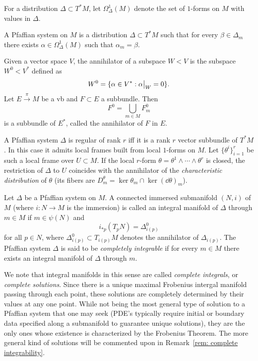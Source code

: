 For a distribution $\Delta\subset T^\ast M$, let $\Omega^1_\Delta(M)$ denote the set of $1$-forms on $M$ with values in $\Delta$.

\begin{defn}
    A Pfaffian system on $M$ is a distribution $\Delta\subset T^\ast M$ such that for every $\beta\in\Delta_m$ there exists $\alpha\in\Omega^1_\Delta(M)$ such that $\alpha_m=\beta$.
\end{defn}

\begin{defn}[Annihilator]
    Given a vector space $V$, the annihilator of a subspace $W<V$ is the subspace $W^0<V^\ast$ defined as
    \[W^0=\{\alpha\in V^\ast: \restr{\alpha}{W}=0 \}.\]
    Let $E\overset{\pi}{\to}M$ be a \gls{vb} and $F\subset E$ a subbundle. Then
    \[F^0=\bigcup_{m\in M}F_m^0\]
    is a subbundle of $E^\ast$, called the annihilator of $F$ in $E$.
\end{defn}


\begin{rem}
    A Pfaffian system $\Delta$ is regular of rank $r$ iff it is a rank $r$ vector subbundle of $T^\ast M$. In this case it admits local frames built from local $1$-forms on $M$. Let $\{\theta^i\}_{i=1}^r$ be such a local frame over $U\subset M$. If the local $r$-form $\theta=\theta^1\wedge\cdots\wedge\theta^r$ is closed, the restriction of $\Delta$ to $U$ coincides with the annihilator of the \emph{characteristic distribution} of $\theta$ (its fibers are $D^\theta_m=\ker\theta_m\cap \ker(\dd\theta)_m$).
\end{rem}

\begin{defn}
    Let $\Delta$ be a Pfaffian system on $M$. A connected immersed submanifold $(N,i)$ of $M$ (where $i:N\to M$ is the immersion) is called an integral manifold of $\Delta$ through $m\in M$ if $m\in\psi(N)$ and 
    \[i_{\ast p}(T_pN)=\Delta_{i(p)}^0\]
    for all $p\in N$, where $\Delta_{i(p)}^0\subset T_{i(p)}M$ denotes the annihilator of $\Delta_{i(p)}$. The Pfaffian system $\Delta$ is said to be \emph{completely integrable} if for every $m\in M$ there exists an integral manifold of $\Delta$ through $m$.
\end{defn}

We note that integral manifolds in this sense are called \emph{complete integrals}, or \emph{complete solutions}. Since there is a unique maximal Frobenius intergal manifold passing through each point, these solutions are completely determined by their values at any one point. While not being the most general type of solution to a Pfaffian system that one may seek (PDE's typically require initial or boundary data specified along a submanifold to guarantee unique solutions), they are the only ones whose existence is characterized by the Frobenius Theorem. The more general kind of solutions will be commented upon in Remark~\ref{rem: complete integrability}.

